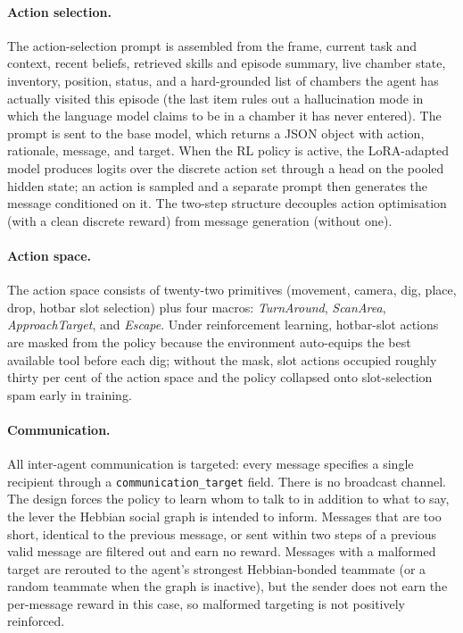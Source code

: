\documentclass{article}
\theoremstyle{plain}
\theoremstyle{definition}
\theoremstyle{remark}
\begin{document}
\paragraph{Action selection.}
The action-selection prompt is assembled from the frame, current task and context, recent beliefs, retrieved skills and episode summary, live chamber state, inventory, position, status, and a hard-grounded list of chambers the agent has actually visited this episode (the last item rules out a hallucination mode in which the language model claims to be in a chamber it has never entered). The prompt is sent to the base model, which returns a JSON object with action, rationale, message, and target. When the RL policy is active, the LoRA-adapted model produces logits over the discrete action set through a head on the pooled hidden state; an action is sampled and a separate prompt then generates the message conditioned on it. The two-step structure decouples action optimisation (with a clean discrete reward) from message generation (without one).

\paragraph{Action space.}
The action space consists of twenty-two primitives (movement, camera, dig, place, drop, hotbar slot selection) plus four macros: \emph{TurnAround}, \emph{ScanArea}, \emph{ApproachTarget}, and \emph{Escape}. Under reinforcement learning, hotbar-slot actions are masked from the policy because the environment auto-equips the best available tool before each dig; without the mask, slot actions occupied roughly thirty per cent of the action space and the policy collapsed onto slot-selection spam early in training.

\paragraph{Communication.}
All inter-agent communication is targeted: every message specifies a single recipient through a \texttt{communication\_target} field. There is no broadcast channel. The design forces the policy to learn whom to talk to in addition to what to say, the lever the Hebbian social graph is intended to inform. Messages that are too short, identical to the previous message, or sent within two steps of a previous valid message are filtered out and earn no reward. Messages with a malformed target are rerouted to the agent's strongest Hebbian-bonded teammate (or a random teammate when the graph is inactive), but the sender does not earn the per-message reward in this case, so malformed targeting is not positively reinforced.
\end{document}
